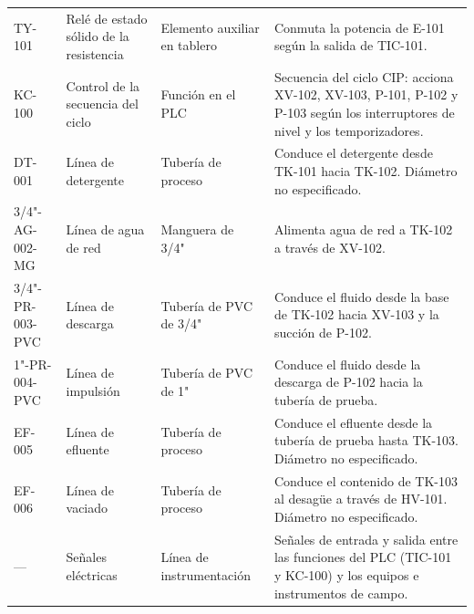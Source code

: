\begin{scriptsize}
\begin{longtable}{L{2.5cm}L{3.5cm}L{3.0cm}L{\anchoflexpid}}
TY-101 & Relé de estado sólido de la resistencia & Elemento auxiliar en tablero & Conmuta la potencia de E-101 según la salida de TIC-101. \\
KC-100 & Control de la secuencia del ciclo & Función en el PLC & Secuencia del ciclo CIP: acciona XV-102, XV-103, P-101, P-102 y P-103 según los interruptores de nivel y los temporizadores. \\
DT-001 & Línea de detergente & Tubería de proceso & Conduce el detergente desde TK-101 hacia TK-102. Diámetro no especificado. \\
3/4"-AG-002-MG & Línea de agua de red & Manguera de 3/4" & Alimenta agua de red a TK-102 a través de XV-102. \\
3/4"-PR-003-PVC & Línea de descarga & Tubería de PVC de 3/4" & Conduce el fluido desde la base de TK-102 hacia XV-103 y la succión de P-102. \\
1"-PR-004-PVC & Línea de impulsión & Tubería de PVC de 1" & Conduce el fluido desde la descarga de P-102 hacia la tubería de prueba. \\
EF-005 & Línea de efluente & Tubería de proceso & Conduce el efluente desde la tubería de prueba hasta TK-103. Diámetro no especificado. \\
EF-006 & Línea de vaciado & Tubería de proceso & Conduce el contenido de TK-103 al desagüe a través de HV-101. Diámetro no especificado. \\
--- & Señales eléctricas & Línea de instrumentación & Señales de entrada y salida entre las funciones del PLC (TIC-101 y KC-100) y los equipos e instrumentos de campo. \\

\end{longtable}
\end{scriptsize}